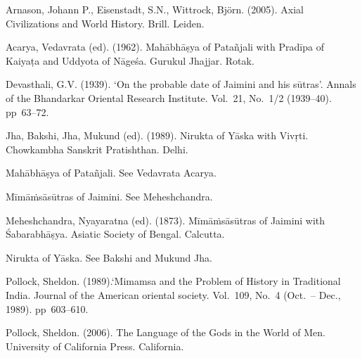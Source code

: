 
\begin{thebibliography}{99}
 Arnason, Johann P., Eisenstadt, S.N., Wittrock, Björn. (2005). Axial Civilizations and World History. Brill. Leiden. 

 Acarya, Vedavrata (ed). (1962). Mahābhāṣya of Patañjali with Pradīpa of Kaiyaṭa and Uddyota of Nāgeśa. Gurukul Jhajjar. Rotak. 

 Devasthali, G.V. (1939). ‘On the probable date of Jaimini and his sūtras’. Annals of the Bhandarkar Oriental Research Institute.  
Vol.~21, No.~1/2 (1939--40). pp~63--72.

 Jha, Bakshi, Jha, Mukund (ed). (1989). Nirukta of Yāska with Vivṛti. Chowkambha Sanskrit Pratishthan. Delhi. 

 Mahābhāṣya of Patañjali. See Vedavrata Acarya. 

 Mīmāṁsāsūtras of Jaimini. See Meheshchandra.

 Meheshchandra, Nyayaratna (ed). (1873). Mīmāṁsāsūtras of Jaimini with Śabarabhāṣya. Asiatic Society of Bengal. Calcutta. 

 Nirukta of Yāska. See Bakshi and Mukund Jha. 

 Pollock, Sheldon. (1989).‘Mimamsa and the Problem of History in Traditional India. Journal of the American oriental society. Vol.~109, No.~4 (Oct.\ -- Dec., 1989). pp~603--610. 

  Pollock, Sheldon. (2006). The Language of the Gods in the World of Men. University of California Press. California. 
\end{thebibliography}
